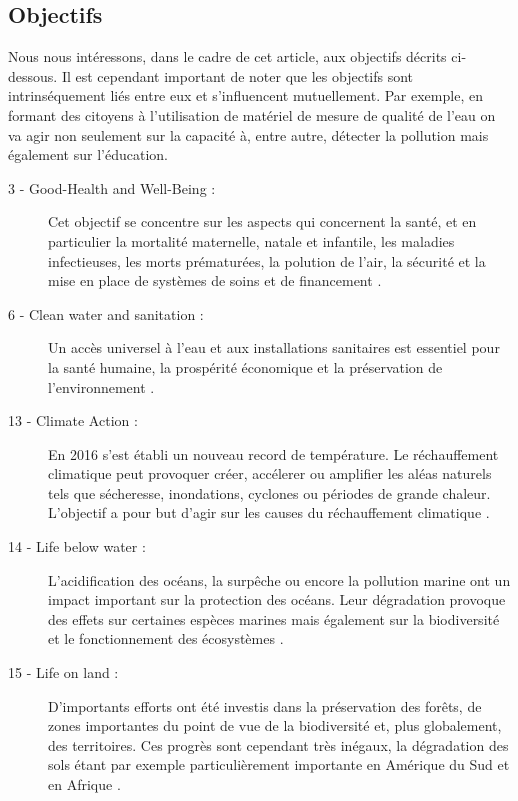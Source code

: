 \documentclass[10pt, conference, compsocconf]{llncs}
\begin{document}
		\subsection{Objectifs}
		Nous nous intéressons, dans le cadre de cet article, aux objectifs décrits ci-dessous. Il est cependant important de noter que les objectifs sont intrinséquement liés entre eux et s'influencent mutuellement. Par exemple, en formant des citoyens à l'utilisation de matériel de mesure de qualité de l'eau on va agir non seulement sur la capacité à, entre autre, détecter la pollution mais également sur l'éducation.
		\begin{description}
			\item[ 3 - Good-Health and Well-Being :] Cet objectif se concentre sur les aspects qui	concernent la santé, et en particulier la mortalité maternelle, natale et infantile, les maladies infectieuses, les morts prématurées, la polution de l'air, la sécurité et la mise en place de systèmes de soins et de financement \cite{united_nations_goal_nodate-5}.
			\item[ 6 - Clean water and sanitation :] Un accès universel à l'eau et aux installations sanitaires est essentiel pour la santé humaine, la prospérité économique et la préservation de l'environnement \cite{united_nations_goal_nodate-4}.
			\item[13 - Climate Action :] En 2016 s'est établi un nouveau record de température. Le réchauffement climatique peut provoquer créer, accélerer ou amplifier les aléas	naturels tels que sécheresse, inondations, cyclones ou périodes de grande chaleur. L'objectif a pour but d'agir sur les causes du réchauffement climatique \cite{united_nations_goal_nodate}.
			\item[14 - Life below water :] L'acidification des océans, la surpêche ou encore la pollution marine ont un impact important sur la protection des océans. Leur dégradation provoque des effets sur certaines espèces marines mais également sur la biodiversité et le fonctionnement des écosystèmes \cite{united_nations_goal_nodate-2}.
			\item[15 - Life on land :] D'importants efforts ont été investis dans la préservation des forêts, de zones importantes du point de vue de la biodiversité et, plus globalement, des territoires. Ces progrès sont cependant très inégaux, la dégradation des sols étant par exemple particulièrement importante en Amérique du Sud et en Afrique \cite{united_nations_goal_nodate-3}.
		\end{description}
		
\end{document}

